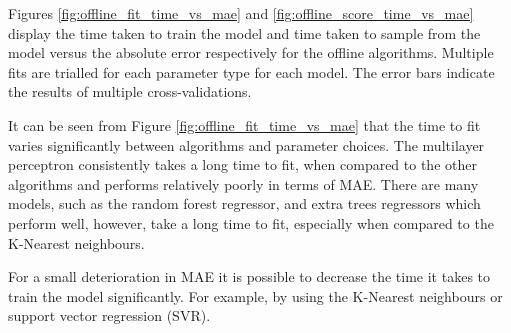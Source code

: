 

%
%


Figures \ref{fig:offline_fit_time_vs_mae} and \ref{fig:offline_score_time_vs_mae} display the time taken to train the model and time taken to sample from the model versus the absolute error respectively for the offline algorithms. Multiple fits are trialled for each parameter type for each model. The error bars indicate the results of multiple cross-validations.

It can be seen from Figure \ref{fig:offline_fit_time_vs_mae} that the time to fit varies significantly between algorithms and parameter choices. The multilayer perceptron consistently takes a long time to fit, when compared to the other algorithms and performs relatively poorly in terms of MAE. There are many models, such as the random forest regressor, and extra trees regressors which perform well, however, take a long time to fit, especially when compared to the K-Nearest neighbours.

For a small deterioration in MAE it is possible to decrease the time it takes to train the model significantly. For example, by using the K-Nearest neighbours or support vector regression (SVR).



